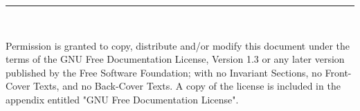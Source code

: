 



\thispagestyle{empty}
\cleardoublepage
\thispagestyle{empty}



\thispagestyle{empty}
\noindent\rule[-1ex]{\textwidth}{2pt}\\[4.5ex]
\vfill

\vspace{.5cm}

\noindent Permission is granted to copy, distribute and/or modify this
document under the terms of the GNU Free Documentation License,
Version 1.3 or any later version published by the Free Software
Foundation; with no Invariant Sections, no Front-Cover Texts, and no
Back-Cover Texts.  A copy of the license is included in the appendix
entitled "GNU Free Documentation License".


\clearpage
\thispagestyle{empty}
\begin{center}
{\large\bfseries \myTitle}\\
\end{center}
\begin{center}
\myName
\end{center}
\\
\vspace{0.7cm}

\\


\clearpage
\thispagestyle{empty}
\begin{center}
{\large\bfseries \myTitle}\\
\end{center}
\begin{center}
\myName
\end{center}
\\
\vspace{0.7cm}

